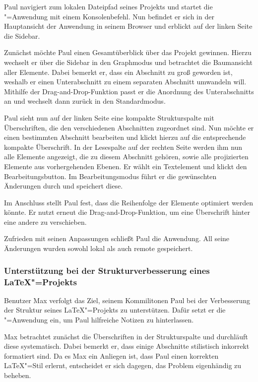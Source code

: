 Paul navigiert zum lokalen Dateipfad seines Projekts und startet die \texla"=Anwendung mit einem Konsolenbefehl.
Nun befindet er sich in der Hauptansicht der Anwendung in seinem Browser und erblickt auf der linken
Seite die Sidebar.

Zunächst möchte Paul einen Gesamtüberblick über das Projekt gewinnen.
Hierzu wechselt er über die Sidebar in den Graphmodus und betrachtet die Baumansicht aller Elemente.
Dabei bemerkt er, dass ein Abschnitt zu groß geworden ist, weshalb er einen Unterabschnitt zu einem separaten Abschnitt
umwandeln will.
Mithilfe der Drag-and-Drop-Funktion passt er die Anordnung des Unterabschnitts an und wechselt dann zurück in den
Standardmodus.

Paul sieht nun auf der linken Seite eine kompakte Strukturspalte
mit Überschriften, die den verschiedenen Abschnitten zugeordnet sind.
Nun möchte er einen bestimmten Abschnitt bearbeiten und klickt hierzu auf die entsprechende kompakte Überschrift.
In der Lesespalte auf der rechten Seite werden ihm nun alle Elemente angezeigt, die zu diesem Abschnitt
gehören, sowie alle projizierten Elemente aus vorhergehenden Ebenen.
Er wählt ein Textelement und klickt den Bearbeitungsbutton.
Im Bearbeitungsmodus führt er die gewünschten Änderungen durch und speichert diese.

Im Anschluss stellt Paul fest, dass die Reihenfolge der Elemente optimiert werden könnte.
Er nutzt erneut die Drag-and-Drop-Funktion, um eine Überschrift hinter eine andere zu verschieben.

Zufrieden mit seinen Anpassungen schließt Paul die Anwendung.
All seine Änderungen wurden sowohl lokal als auch remote gespeichert.

\subsubsection{Unterstützung bei der Strukturverbesserung eines \LaTeX"=Projekts}

Benutzer Max verfolgt das Ziel, seinem Kommilitonen Paul bei der Verbesserung der Struktur seines
\LaTeX"=Projekts zu unterstützen.
Dafür setzt er die \texla"=Anwendung ein, um Paul hilfreiche Notizen zu hinterlassen.

Max betrachtet zunächst die Überschriften in der Strukturspalte und durchläuft diese systematisch.
Dabei bemerkt er, dass einige Abschnitte stilistisch inkorrekt formatiert sind.
Da es Max ein Anliegen ist, dass Paul einen korrekten \LaTeX"=Stil erlernt, entscheidet
er sich dagegen, das Problem eigenhändig zu beheben.

